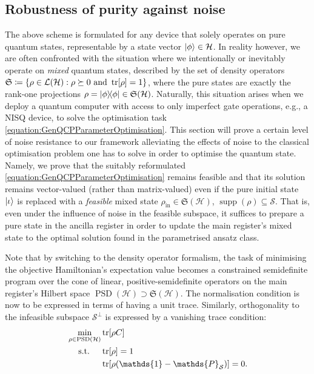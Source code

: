 \documentclass[10pt,conference]{IEEEtran}
\DeclareMathOperator{\PSD}{PSD}       %
\DeclareMathOperator{\supp}{supp}     %
\newcommand*{\hil}{\mathcal{H}}       %
\newcommand*{\solspace}{\mathcal{S}}  %
\newcommand*{\one}{\mathds{1}}        %
\newcommand*{\projection}{\mathds{P}} %
\newcommand*{\lo}{\mathcal{L}}        %
\newcommand*{\mathhphantomdisplay}[2]{\mathmakebox[\widthof{$\displaystyle #1$}][l]{#2}}
\begin{document}
\subsection{\label{subsection:RobustnessOfPurityAgainstNoise}Robustness of purity against noise}

The above scheme is formulated for any device that solely operates on pure quantum states, representable by a state vector $\ket{\phi} \in \hil$.
In reality however, we are often confronted with the situation where we intentionally or inevitably operate on \emph{mixed} quantum states, described by the set of density operators $\mathfrak{S} \coloneqq \{ \rho \in \lo(\hil): \rho \succeq 0\ \text{and}\ \tr[\rho] = 1 \}$, where the pure states are exactly the rank-one projections $\rho = \ketbra{\phi}{\phi} \in \mathfrak{S}(\hil)$.
Naturally, this situation arises when we deploy a quantum computer with access to only imperfect gate operations, e.g., a NISQ device, to solve the optimisation task \eqref{equation:GenQCPParameterOptimisation}.
This section will prove a certain level of noise resistance to our framework alleviating the effects of noise to the classical optimisation problem one has to solve in order to optimise the quantum state.
Namely, we prove that the suitably reformulated \eqref{equation:GenQCPParameterOptimisation} remains feasible and that its solution remains vector-valued (rather than matrix-valued) even if the pure initial state $\ket{\iota}$ is replaced with a \emph{feasible} mixed state $\rho_{\text{in}} \in \mathfrak{S}(\hil)$, $\supp(\rho) \subseteq \solspace$.
That is, even under the influence of noise in the feasible subspace, it suffices to prepare a pure state in the ancilla register in order to update the main register's mixed state to the optimal solution found in the parametrised ansatz class.

Note that by switching to the density operator formalism, the task of minimising the objective Hamiltonian's expectation value becomes a constrained semidefinite program over the cone of linear, positive-semidefinite operators on the main register's Hilbert space $\PSD(\hil) \supset \mathfrak{S}(\hil)$.
The normalisation condition is now to be expressed in terms of having a unit trace.
Similarly, orthogonality to the infeasible subspace $\solspace^{\perp}$ is expressed by a vanishing trace condition:
\begin{align}\label{equation:CCOPSDP}
    \begin{split}
        &\min_{\rho \in \PSD(\hil)} \tr[\rho C] \\
        &\mathhphantomdisplay{\min_{\rho \in \PSD(\hil)}}{\quad \ \text{s.t.}}\, \tr[\rho] = 1 \\
        &\hphantom{\min_{\rho \in \PSD(\hil)}}\, \tr[\rho (\one - \projection_{\solspace})] = 0.
    \end{split}
\end{align}
\end{document}
